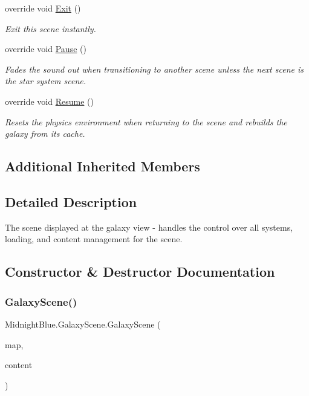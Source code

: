 \begin{DoxyCompactItemize}
override void \hyperlink{class_midnight_blue_1_1_galaxy_scene_a7a96978e050da997330bcc0f3cd00f9e}{Exit} ()
\begin{DoxyCompactList}\small\item\em Exit this scene instantly. \end{DoxyCompactList}\item 
override void \hyperlink{class_midnight_blue_1_1_galaxy_scene_aeb44afaeda2cccd225e64908bb76bee4}{Pause} ()
\begin{DoxyCompactList}\small\item\em Fades the sound out when transitioning to another scene unless the next scene is the star system scene. \end{DoxyCompactList}\item 
override void \hyperlink{class_midnight_blue_1_1_galaxy_scene_ab641e6727cdb64dc6487e9a229521692}{Resume} ()
\begin{DoxyCompactList}\small\item\em Resets the physics environment when returning to the scene and rebuilds the galaxy from its cache. \end{DoxyCompactList}\end{DoxyCompactItemize}
\subsection*{Additional Inherited Members}


\subsection{Detailed Description}
The scene displayed at the galaxy view -\/ handles the control over all systems, loading, and content management for the scene. 



\subsection{Constructor \& Destructor Documentation}
\hypertarget{class_midnight_blue_1_1_galaxy_scene_acdd82e3464ea18ca77bcf4694e9803a5}{}\label{class_midnight_blue_1_1_galaxy_scene_acdd82e3464ea18ca77bcf4694e9803a5} 
\subsubsection{\texorpdfstring{Galaxy\+Scene()}{GalaxyScene()}}
{\footnotesize\ttfamily Midnight\+Blue.\+Galaxy\+Scene.\+Galaxy\+Scene (\begin{DoxyParamCaption}\item[{\hyperlink{class_m_b2_d_1_1_entity_component_1_1_entity_map}{Entity\+Map}}]{map,  }\item[{Content\+Manager}]{content }\end{DoxyParamCaption})\hspace{0.3cm}{\ttfamily [inline]}}



